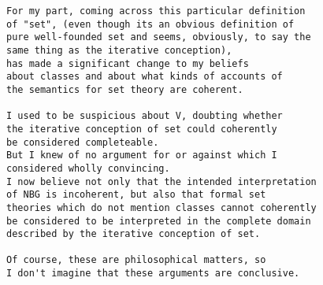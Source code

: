 \documentclass[numreferences]{rbjk}
\begin{document}
\begin{article}
\begin{verbatim}
For my part, coming across this particular definition
of "set", (even though its an obvious definition of
pure well-founded set and seems, obviously, to say the
same thing as the iterative conception),
has made a significant change to my beliefs
about classes and about what kinds of accounts of
the semantics for set theory are coherent.

I used to be suspicious about V, doubting whether
the iterative conception of set could coherently
be considered completeable.
But I knew of no argument for or against which I
considered wholly convincing.
I now believe not only that the intended interpretation
of NBG is incoherent, but also that formal set
theories which do not mention classes cannot coherently
be considered to be interpreted in the complete domain
described by the iterative conception of set.

Of course, these are philosophical matters, so
I don't imagine that these arguments are conclusive.

\end{verbatim}

%

%
%

\end{article}
\end{document}

